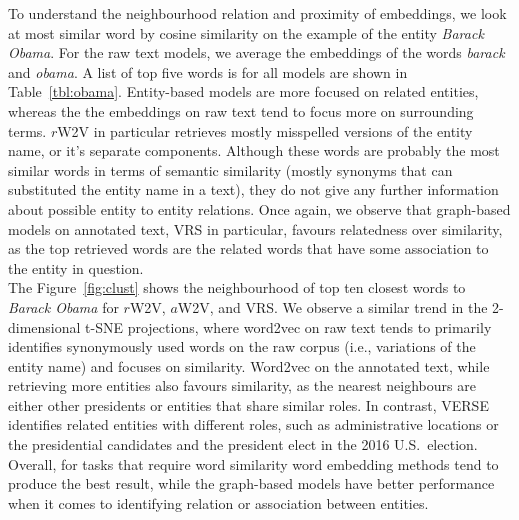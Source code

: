To understand the neighbourhood relation and proximity of embeddings, we look at most similar word by cosine similarity on the example of the entity \emph{Barack Obama}. For the raw text models, we average the embeddings of the words \emph{barack} and \emph{obama}. A list of top five words is for all models are shown in Table~\ref{tbl:obama}. Entity-based models are more focused on related entities, whereas the the embeddings on raw text tend to focus more on surrounding terms. $r$W2V in particular retrieves mostly misspelled versions of the entity name, or it's separate components. Although these words are probably the most similar words in terms of semantic similarity (mostly synonyms that can substituted the entity name in a text), they do not give any further information about possible entity to entity relations. Once again, we observe that graph-based models on annotated text, VRS in particular, favours relatedness over similarity, as the top retrieved words are the related words that have some association to the entity in question. \\
The Figure~\ref{fig:clust} shows the neighbourhood of top ten closest words to \emph{Barack Obama} for $r$W2V, $a$W2V, and VRS. We observe a similar trend in the 2-dimensional t-SNE projections, where word2vec on raw text tends to primarily identifies synonymously used words on the raw corpus (i.e., variations of the entity name) and focuses on similarity. Word2vec on the annotated text, while retrieving more entities also favours similarity, as the nearest neighbours are either other presidents or entities that share similar roles. In contrast, VERSE identifies related entities with different roles, such as administrative locations or the presidential candidates and the president elect in the 2016 U.S.\ election.\\
Overall, for tasks that require word similarity word embedding methods tend to produce the best result, while the graph-based models have better performance when it comes to identifying relation or association between entities.
